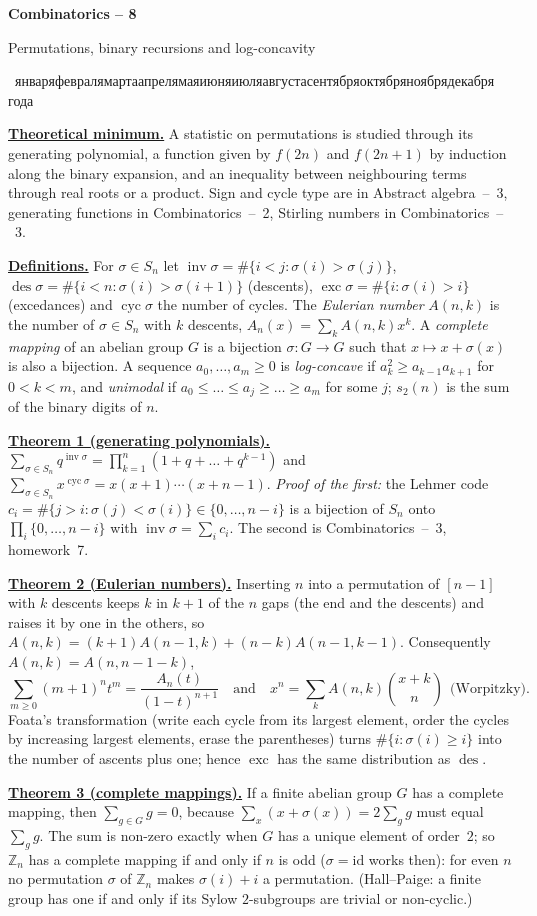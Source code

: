 \documentclass[11pt,a4paper]{article}
\newcommand{\head}[1]{\par\medskip\noindent\textbf{\underline{#1}}\quad}
\newcommand{\sheettitle}[3]{%
  \begin{center}
  {\huge\bfseries #1\par}\vspace{1.2em}
  {\Large #2\par}\vspace{0.8em}
  \if\relax\detokenize{#3}\relax\else{\Large #3\par}\vspace{0.8em}\fi
  {\rudate\par}
  \end{center}\vspace{0.5em}}
\newcommand{\rudate}{\foreignlanguage{russian}{\number\day~\ifcase\month\or января\or февраля\or марта\or апреля\or мая\or июня\or июля\or августа\or сентября\or октября\or ноября\or декабря\fi\ \number\year~года}}
\DeclareMathOperator{\inv}{inv}
\DeclareMathOperator{\des}{des}
\DeclareMathOperator{\exc}{exc}
\DeclareMathOperator{\cyc}{cyc}
\begin{document}
\sheettitle{Combinatorics -- 8}{Permutations, binary recursions and log-concavity}{}

\head{Theoretical minimum.} A statistic on permutations is studied through its
generating polynomial, a function given by $f(2n)$ and $f(2n+1)$ by induction along the
binary expansion, and an inequality between neighbouring terms through real roots or a
product. Sign and cycle type are in Abstract algebra~--~3, generating functions in
Combinatorics~--~2, Stirling numbers in Combinatorics~--~3.

\head{Definitions.} For $\sigma\in S_n$ let $\inv\sigma=\#\{i<j:\sigma(i)>\sigma(j)\}$,
$\des\sigma=\#\{i<n:\sigma(i)>\sigma(i+1)\}$ (descents), $\exc\sigma=\#\{i:\sigma(i)>i\}$
(excedances) and $\cyc\sigma$ the number of cycles. The \emph{Eulerian number} $A(n,k)$ is
the number of $\sigma\in S_n$ with $k$ descents, $A_n(x)=\sum_k A(n,k)x^k$. A
\emph{complete mapping} of an abelian group $G$ is a bijection $\sigma\colon G\to G$ such that
$x\mapsto x+\sigma(x)$ is also a bijection. A sequence $a_0,\dots,a_m\geqslant 0$ is
\emph{log-concave} if $a_k^2\geqslant a_{k-1}a_{k+1}$ for $0<k<m$, and \emph{unimodal} if
$a_0\leqslant\dots\leqslant a_j\geqslant\dots\geqslant a_m$ for some $j$; $s_2(n)$ is the
sum of the binary digits of $n$.

\head{Theorem 1 (generating polynomials).}
$\sum_{\sigma\in S_n}q^{\inv\sigma}=\prod_{k=1}^{n}(1+q+\dots+q^{k-1})$ and
$\sum_{\sigma\in S_n}x^{\cyc\sigma}=x(x+1)\cdots(x+n-1)$. \emph{Proof of the first:} the
Lehmer code $c_i=\#\{j>i:\sigma(j)<\sigma(i)\}\in\{0,\dots,n-i\}$ is a bijection of $S_n$
onto $\prod_i\{0,\dots,n-i\}$ with $\inv\sigma=\sum_i c_i$. The second is
Combinatorics~--~3, homework~7.

\head{Theorem 2 (Eulerian numbers).} Inserting $n$ into a permutation of $[n-1]$ with $k$
descents keeps $k$ in $k+1$ of the $n$ gaps (the end and the descents) and raises it by one
in the others, so $A(n,k)=(k+1)A(n-1,k)+(n-k)A(n-1,k-1)$. Consequently
$A(n,k)=A(n,n-1-k)$,
\[
\sum_{m\geqslant0}(m+1)^nt^m=\frac{A_n(t)}{(1-t)^{n+1}}
\quad\text{and}\quad
x^n=\sum_k A(n,k)\binom{x+k}{n}\ \ \text{(Worpitzky)}.
\]
Foata's transformation (write each cycle from its largest element, order the cycles by
increasing largest elements, erase the parentheses) turns $\#\{i:\sigma(i)\geqslant i\}$ into
the number of ascents plus one; hence $\exc$ has the same distribution as $\des$.

\head{Theorem 3 (complete mappings).} If a finite abelian group $G$ has a complete mapping,
then $\sum_{g\in G}g=0$, because $\sum_x(x+\sigma(x))=2\sum_g g$ must equal $\sum_g g$. The
sum is non-zero exactly when $G$ has a unique element of order~$2$; so $\mathbb Z_n$ has a
complete mapping if and only if $n$ is odd ($\sigma=\mathrm{id}$ works then): for even $n$
no permutation $\sigma$ of $\mathbb Z_n$ makes $\sigma(i)+i$ a permutation. (Hall--Paige: a
finite group has one if and only if its Sylow $2$-subgroups are trivial or non-cyclic.)
\end{document}
